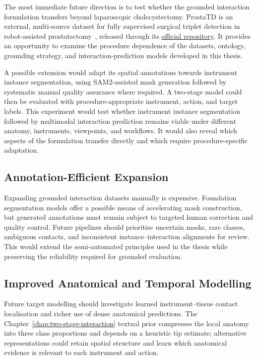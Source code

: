 The most immediate future direction is to test whether the grounded interaction formulation transfers beyond laparoscopic cholecystectomy. ProstaTD is an external, multi-source dataset for fully supervised surgical triplet detection in robot-assisted prostatectomy~\cite{prostatd}, released through its \href{https://github.com/yik-leung/ProstaTD}{official repository}. It provides an opportunity to examine the procedure dependence of the datasets, ontology, grounding strategy, and interaction-prediction models developed in this thesis.

A possible extension would adapt its spatial annotations towards instrument instance segmentation, using SAM2-assisted mask generation followed by systematic manual quality assurance where required. A two-stage model could then be evaluated with procedure-appropriate instrument, action, and target labels. This experiment would test whether instrument instance segmentation followed by multimodal interaction prediction remains viable under different anatomy, instruments, viewpoints, and workflows. It would also reveal which aspects of the formulation transfer directly and which require procedure-specific adaptation.

\subsection{Annotation-Efficient Expansion}
\label{sec:discussion-annotation-future}

Expanding grounded interaction datasets manually is expensive. Foundation segmentation models offer a possible means of accelerating mask construction, but generated annotations must remain subject to targeted human correction and quality control. Future pipelines should prioritise uncertain masks, rare classes, ambiguous contacts, and inconsistent instance--interaction alignments for review. This would extend the semi-automated principles used in the thesis while preserving the reliability required for grounded evaluation.

\subsection{Improved Anatomical and Temporal Modelling}
\label{sec:discussion-context-future}

Future target modelling should investigate learned instrument--tissue contact localisation and richer use of dense anatomical predictions. The Chapter~\ref{chap:two-stage-interaction} textual prior compresses the local anatomy into three class proportions and depends on a heuristic tip estimate; alternative representations could retain spatial structure and learn which anatomical evidence is relevant to each instrument and action.

